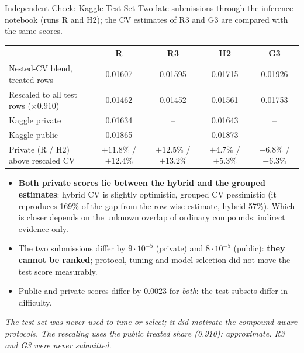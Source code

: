 \documentclass[aspectratio=169,10pt]{beamer}
\newcommand{\smallnote}[1]{{\tiny\textit{#1}}}
\begin{document}
\begin{frame}{Independent Check: Kaggle Test Set}
\small
Two late submissions through the inference notebook (runs R and H2); the CV estimates of R3 and G3 are compared with the same scores.
\vspace{0.3em}

\centering
\footnotesize
\setlength{\tabcolsep}{4pt}
\begin{tabular}{lcccc}
\toprule
 & \textbf{R} & \textbf{R3} & \textbf{H2} & \textbf{G3}\\
\midrule
Nested-CV blend, treated rows & 0.01607 & 0.01595 & 0.01715 & 0.01926\\
Rescaled to all test rows ($\times0.910$) & 0.01462 & 0.01452 & 0.01561 & 0.01753\\
Kaggle private & 0.01634 & -- & 0.01643 & --\\
Kaggle public & 0.01865 & -- & 0.01873 & --\\
Private (R / H2) above rescaled CV & $+11.8\%$ / $+12.4\%$ & $+12.5\%$ / $+13.2\%$ & $+4.7\%$ / $+5.3\%$ & $-6.8\%$ / $-6.3\%$\\
\bottomrule
\end{tabular}
\vspace{0.4em}

\raggedright
\small
\begin{itemize}
  \item \textbf{Both private scores lie between the hybrid and the grouped estimates}: hybrid CV is slightly optimistic, grouped CV pessimistic (it reproduces 169\% of the gap from the row-wise estimate, hybrid 57\%). Which is closer depends on the unknown overlap of ordinary compounds: indirect evidence only.
  \item The two submissions differ by $9\cdot10^{-5}$ (private) and $8\cdot10^{-5}$ (public): \textbf{they cannot be ranked}; protocol, tuning and model selection did not move the test score measurably.
  \item Public and private scores differ by 0.0023 for \emph{both}: the test subsets differ in difficulty.
\end{itemize}
\smallnote{The test set was never used to tune or select; it did motivate the compound-aware protocols. The rescaling uses the public treated share (0.910): approximate. R3 and G3 were never submitted.}
\end{frame}
\end{document}
